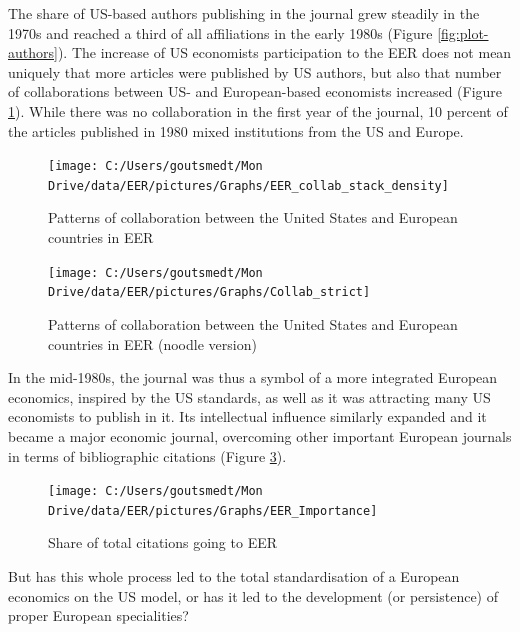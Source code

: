 \documentclass[]{elsarticle} %
\begin{document}
The share of US-based authors publishing in the journal grew steadily in
the 1970s and reached a third of all affiliations in the early 1980s
(Figure \ref{fig:plot-authors}). The increase of US economists
participation to the EER does not mean uniquely that more articles were
published by US authors, but also that number of collaborations between
US- and European-based economists increased (Figure
\ref{fig:plot-collabs}). While there was no collaboration in the first
year of the journal, 10 percent of the articles published in 1980 mixed
institutions from the US and Europe.

\begin{figure}[h]

{\centering \texttt{[image: C:/Users/goutsmedt/Mon Drive/data/EER/pictures/Graphs/EER\_collab\_stack\_density]} 

}

\caption{Patterns of collaboration between the United States and European countries in EER}\label{fig:plot-collabs}
\end{figure}

\begin{figure}[h]

{\centering \texttt{[image: C:/Users/goutsmedt/Mon Drive/data/EER/pictures/Graphs/Collab\_strict]} 

}

\caption{Patterns of collaboration between the United States and European countries in EER (noodle version)}\label{fig:plot-collabs2}
\end{figure}

In the mid-1980s, the journal was thus a symbol of a more integrated
European economics, inspired by the US standards, as well as it was
attracting many US economists to publish in it. Its intellectual
influence similarly expanded and it became a major economic journal,
overcoming other important European journals in terms of bibliographic
citations (Figure \ref{fig:plot-eer-importance}).

\begin{figure}[h]

{\centering \texttt{[image: C:/Users/goutsmedt/Mon Drive/data/EER/pictures/Graphs/EER\_Importance]} 

}

\caption{Share of total citations going to EER}\label{fig:plot-eer-importance}
\end{figure}

But has this whole process led to the total standardisation of a
European economics on the US model, or has it led to the development (or
persistence) of proper European specialities?
\end{document}
